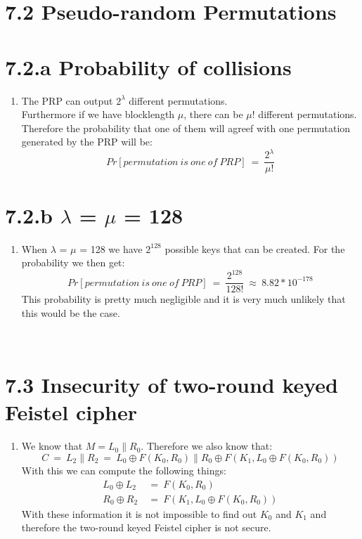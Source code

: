 \documentclass{report}
\begin{document}
	\section*{7.2 Pseudo-random Permutations}
	\section*{7.2.a Probability of collisions}
	\begin{enumerate}[]
		\item The PRP can output $2^{\lambda}$ different permutations. \\
		Furthermore if we have blocklength $\mu$, there can be $\mu !$ different permutations. Therefore the probability that one of them will agreef with one permutation generated by the PRP will be:
		\[
			Pr[permutation \ is \ one \ of \ PRP] \ = \  \frac{2^{\lambda}}{\mu !}
		\]
	\end{enumerate}
	\section*{7.2.b $\lambda$ = $\mu$ = 128}
	\begin{enumerate}[]
		\item When $\lambda$ = $\mu$ = 128 we have $2^{128}$ possible keys that can be created. For the probability we then get:
		\[
			Pr[permutation \ is \ one \ of \ PRP] \ = \ \frac{2^{128}}{128!}\ \approx \ 8.82 * 10^{-178}
		\]
		This probability is pretty much negligible and it is very much unlikely that this would be the case.
	\end{enumerate}
	\hfill \\
	\section*{7.3 Insecurity of two-round keyed Feistel cipher}
	\begin{enumerate}[]
		\item We know that $M = L_0 \| R_0$. Therefore we also know that:
		\[
			C \ = \ L_2 \| R_2 \ = \ L_0 \oplus F(K_0, R_0) \| R_0 \oplus F(K_1, L_0 \oplus F(K_0, R_0)) 
		\]
		With this we can compute the following things:
		\begin{align*}
			L_0 \oplus L_2 \ & = \ F(K_0, R_0) \\
			R_0 \oplus R_2 \ & = \ F(K_1, L_0 \oplus F(K_0, R_0)) 
		\end{align*}
		With these information it is not impossible to find out $K_0$ and $K_1$ and therefore the two-round keyed Feistel cipher is not secure.
	\end{enumerate}
	
\end{document}
